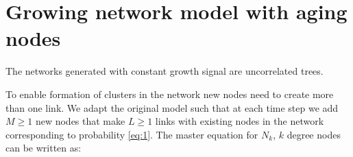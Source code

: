 \section{Growing network model with aging nodes}





The networks generated with constant growth signal are uncorrelated trees. 

To enable formation of clusters in the network new nodes need to create more than one link. We adapt the original model such that at each time step we add $M\geq1$ new nodes that make $L\geq1$ links with existing nodes in the network corresponding to probability \ref{eq:1}. 
The master equation for $N_k$, $k$ degree nodes can be written as:

